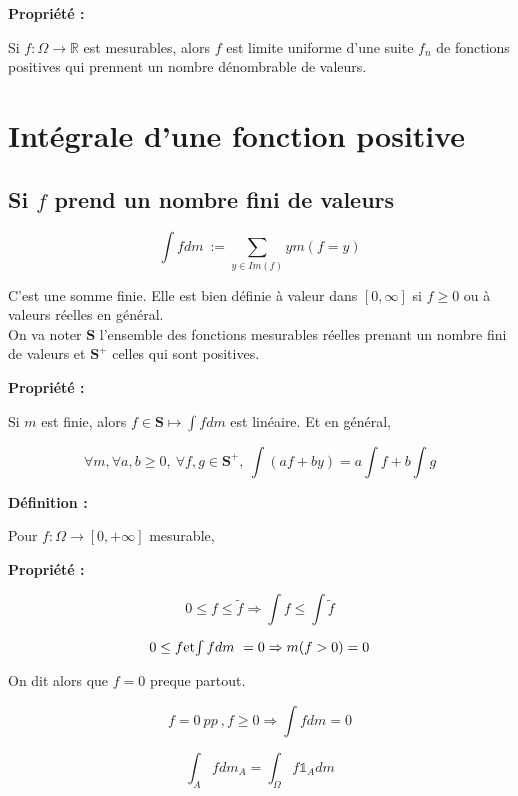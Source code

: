 \documentclass[10pt,a4paper,notitlepage ]{report}
\newcommand{\R}{\mathbb R}
\newenvironment{definition}{
	
	\textbf{Définition : }
}
{}
\newcounter{th}
\newenvironment{propriete}[1][]{
	\begin{tcolorbox}
		\textbf{Propriété #1 : }
}
{\end{tcolorbox}}
\begin{document}
\begin{propriete}
Si $f : \Omega \rightarrow \R$ est mesurables, alors $f$ est limite uniforme d'une suite $f_n$ de fonctions positives qui prennent un nombre dénombrable de valeurs.
\end{propriete}

\section{Intégrale d'une fonction positive}

\subsection{Si $f$ prend un nombre fini de valeurs}

\begin{equation}
\int f dm \ := \sum \limits_{y \in Im(f)} y m(f=y)
\end{equation}

C'est une somme finie. Elle est bien définie à valeur dans $[0, \infty] $ si $f  \geq 0$ ou à valeurs réelles en général. \\

On va noter $\mathbf{S}$ l'ensemble des fonctions mesurables réelles prenant un nombre fini de valeurs et $\mathbf{S}^+$ celles qui sont positives.

\begin{propriete}
Si $m$ est finie, alors $f \in \mathbf{S} \longmapsto \int f dm $ est linéaire. Et en général, 

\begin{equation}
\forall m , \forall a,b \geq 0, \ \forall f, g \in \mathbf{S} ^+ , \ \int (af + by) = a \int f + b \int g
\end{equation}
\end{propriete}

\begin{definition}
Pour $f : \Omega \rightarrow [0,+ \infty ]$ mesurable, 
\end{definition}

\begin{propriete}
\begin{equation}
0 \leq f \leq \tilde f \Rightarrow \int f \leq \int \tilde{f}
\end{equation} 

\begin{equation}
0 \leq f $et$ \int f dm \ = 0 \Rightarrow m(f>0) = 0 
\end{equation}

On dit alors que $f = 0$ preque partout.

\begin{equation}
f = 0 \ pp \ , f \geq 0 \Rightarrow \int f dm = 0
\end{equation}

\begin{equation}
\int _A f dm_A = \int_\Omega f \mathbb{1}_A dm
\end{equation}
\end{propriete}
\end{document}
